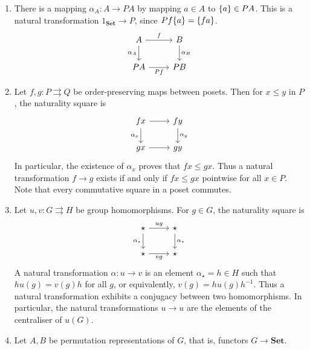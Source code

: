 \begin{example}
\begin{enumerate}
        \item There is a mapping \( \alpha_A : A \to PA \) by mapping \( a \in A \) to \( \qty{a} \in PA \).
        This is a natural transformation \( 1_{\mathbf{Set}} \to P \), since \( Pf\qty{a} = \qty{fa} \).
        \[\begin{tikzcd}
            A & B \\
            PA & PB
            \arrow["f", from=1-1, to=1-2]
            \arrow["{\alpha_B}", from=1-2, to=2-2]
            \arrow["{\alpha_A}"', from=1-1, to=2-1]
            \arrow["Pf"', from=2-1, to=2-2]
        \end{tikzcd}\]
        \item Let \( f, g : P \rightrightarrows Q \) be order-preserving maps between posets.
        Then for \( x \leq y \) in \( P \), the naturality square is
        \[\begin{tikzcd}
            fx & fy \\
            gx & gy
            \arrow["{\alpha_x}"', from=1-1, to=2-1]
            \arrow[from=2-1, to=2-2]
            \arrow["{\alpha_y}", from=1-2, to=2-2]
            \arrow[from=1-1, to=1-2]
        \end{tikzcd}\]
        In particular, the existence of \( \alpha_x \) proves that \( fx \leq gx \).
        Thus a natural transformation \( f \to g \) exists if and only if \( fx \leq gx \) pointwise for all \( x \in P \).
        Note that every commutative square in a poset commutes.
        \item Let \( u, v : G \rightrightarrows H \) be group homomorphisms.
        For \( g \in G \), the naturality square is
        \[\begin{tikzcd}
            \star & \star \\
            \star & \star
            \arrow["ug", from=1-1, to=1-2]
            \arrow["{\alpha_\star}", from=1-2, to=2-2]
            \arrow["{\alpha_\star}"', from=1-1, to=2-1]
            \arrow["vg"', from=2-1, to=2-2]
        \end{tikzcd}\]
        A natural transformation \( \alpha : u \to v \) is an element \( \alpha_\star = h \in H \) such that \( h u(g) = v(g) h \) for all \( g \), or equivalently, \( v(g) = h u(g) h^{-1} \).
        Thus a natural transformation exhibits a conjugacy between two homomorphisms.
        In particular, the natural transformations \( u \to u \) are the elements of the centraliser of \( u(G) \).
        \item Let \( A, B \) be permutation representations of \( G \), that is, functors \( G \to \mathbf{Set} \).

\end{enumerate}
\end{example}
